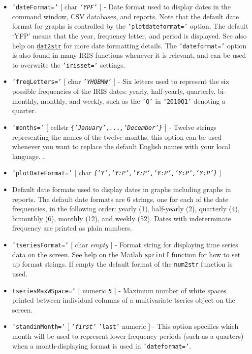\begin{itemize}
\item
  \texttt{'dateFormat='} {[} char \textbar{} \emph{\texttt{'YPF'}} {]} -
  Date format used to display dates in the command window, CSV
  databases, and reports. Note that the default date format for graphs
  is controlled by the \texttt{'plotdateformat='} option. The default
  `YFP' means that the year, frequency letter, and period is displayed.
  See also help on \href{dates/dat2str}{\texttt{dat2str}} for more date
  formatting details. The \texttt{'dateformat='} option is also found in
  many IRIS functions whenever it is relevant, and can be used to
  overwrite the \texttt{'irisset='} settings.
\item
  \texttt{'freqLetters='} {[} char \textbar{} \emph{\texttt{'YHQBMW'}}
  {]} - Six letters used to represent the six possible frequencies of
  the IRIS dates: yearly, half-yearly, quarterly, bi-monthly, monthly,
  and weekly, such as the \texttt{'Q'} in \texttt{'2010Q1'} denoting a
  quarter.
\item
  \texttt{'months='} {[} cellstr \textbar{}
  \emph{\texttt{\{'January',...,'December'\}}} {]} - Twelve strings
  representing the names of the twelve months; this option can be used
  whenever you want to replace the default English names with your local
  language. .
\item
  \texttt{'plotDateFormat='} {[} char \textbar{}
  \emph{\texttt{\{'Y','Y:P','Y:P','Y:P','Y:P','Y:P'\}}} {]}
\item
  Default date formats used to display dates in graphs including graphs
  in reports. The default date formats are 6 strings, one for each of
  the date frequencies, in the following order: yearly (1), half-yearly
  (2), quarterly (4), bimonthly (6), monthly (12), and weekly (52).
  Dates with indeterminate frequency are printed as plain numbers.
\item
  \texttt{'tseriesFormat='} {[} char \textbar{} \emph{empty} {]} -
  Format string for displaying time series data on the screen. See help
  on the Matlab \texttt{sprintf} function for how to set up format
  strings. If empty the default format of the \texttt{num2str} function
  is used.
\item
  \texttt{tseriesMaxWSpace='} {[} numeric \textbar{} \emph{\texttt{5}}
  {]} - Maximum number of white spaces printed between individual
  columns of a multivariate tseries object on the screen.
\item
  \texttt{'standinMonth='} {[} \emph{\texttt{'first'}} \textbar{}
  \texttt{'last'} \textbar{} numeric {]} - This option specifies which
  month will be used to represent lower-frequency periods (such as a
  quarters) when a month-displaying format is used in
  \texttt{'dateformat='}.
\end{itemize}

